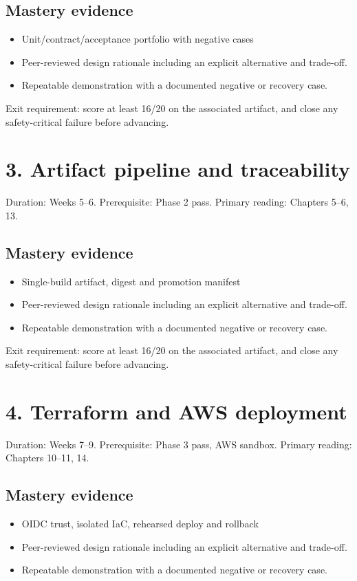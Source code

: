 \documentclass[10pt,letterpaper]{article}
\begin{document}
\subsection{Mastery evidence}
\begin{itemize}
\item Unit/contract/acceptance portfolio with negative cases
\item Peer-reviewed design rationale including an explicit alternative and trade-off.
\item Repeatable demonstration with a documented negative or recovery case.
\end{itemize}

Exit requirement: score at least 16/20 on the associated artifact, and close any safety-critical failure before advancing.


\section{3. Artifact pipeline and traceability}
Duration: Weeks 5--6. Prerequisite: Phase 2 pass. Primary reading: Chapters 5--6, 13.

\subsection{Mastery evidence}
\begin{itemize}
\item Single-build artifact, digest and promotion manifest
\item Peer-reviewed design rationale including an explicit alternative and trade-off.
\item Repeatable demonstration with a documented negative or recovery case.
\end{itemize}

Exit requirement: score at least 16/20 on the associated artifact, and close any safety-critical failure before advancing.


\section{4. Terraform and AWS deployment}
Duration: Weeks 7--9. Prerequisite: Phase 3 pass, AWS sandbox. Primary reading: Chapters 10--11, 14.

\subsection{Mastery evidence}
\begin{itemize}
\item OIDC trust, isolated IaC, rehearsed deploy and rollback
\item Peer-reviewed design rationale including an explicit alternative and trade-off.
\item Repeatable demonstration with a documented negative or recovery case.
\end{itemize}
\end{document}
